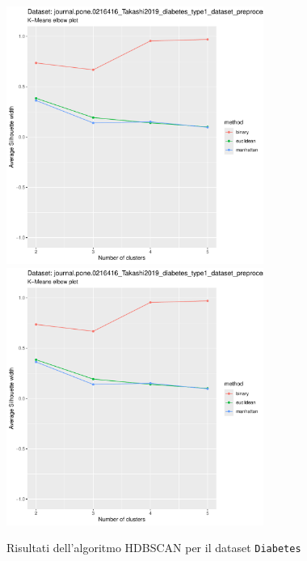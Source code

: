 \documentclass[a4paper, 12pt]{report}
\begin{document}
			\begin{figure}[H]
				\centering
				\includegraphics[width = 0.75\textwidth, height = 0.45\textheight, page = 7]{
					results/results_Diabetes.csv.pdf
				}
				\includegraphics[width = 0.75\textwidth, height = 0.45\textheight, page = 8]{
					results/results_Diabetes.csv.pdf
				}
				\caption{Risultati dell'algoritmo HDBSCAN per il dataset
				\texttt{Diabetes}}
				\label{fig:hdbscan4}
			\end{figure}
\end{document}
